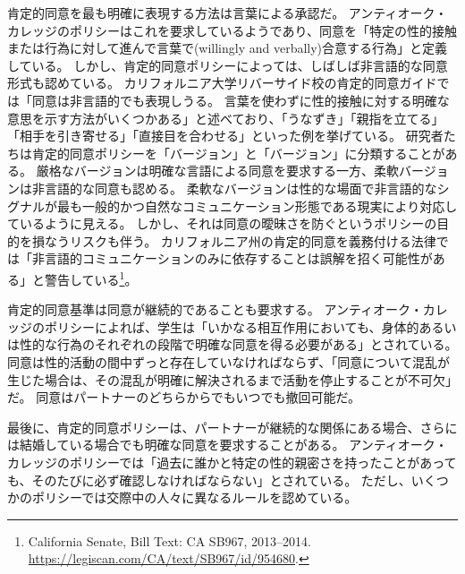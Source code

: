 \documentclass[paper=a4,book,openany]{jlreq}
\newcommand{\ig}[1]{}           %
\begin{document}
肯定的同意を最も明確に表現する方法は言葉による承認だ。
アンティオーク・カレッジのポリシーはこれを要求しているようであり、同意を「特定の性的接触または行為に対して進んで言葉で(willingly and verbally)合意する行為」と定義している\citep{college25:_sexual_offen_preven_polic}。
しかし、肯定的同意ポリシーによっては、しばしば非言語的な同意形式も認めている。
カリフォルニア大学リバーサイド校の肯定的同意ガイドでは「同意は非言語的でも表現しうる。
言葉を使わずに性的接触に対する明確な意思を示す方法がいくつかある」と述べており、「うなずき」「親指を立てる」「相手を引き寄せる」「直接目を合わせる」といった例を挙げている\citep{university25:_what_is_consen}。
研究者たちは肯定的同意ポリシーを「バージョン」と「バージョン」に分類することがある。
厳格なバージョンは明確な言語による同意を要求する一方、柔軟バージョンは非言語的な同意も認める。
柔軟なバージョンは性的な場面で非言語的なシグナルが最も一般的かつ自然なコミュニケーション形態である現実により対応しているように見える。
しかし、それは同意の曖昧さを防ぐというポリシーの目的を損なうリスクも伴う。
カリフォルニア州の肯定的同意を義務付ける法律では「非言語的コミュニケーションのみに依存することは誤解を招く可能性がある」と警告している\footnote{California Senate, Bill Text: CA SB967, 2013--2014. \url{https://legiscan.com/CA/text/SB967/id/954680}.}。

肯定的同意基準は同意が継続的であることも要求する。
アンティオーク・カレッジのポリシーによれば、学生は「いかなる相互作用においても、身体的あるいは性的な行為のそれぞれの段階で明確な同意を得る必要がある」とされている\ig{\footnote{Antioch College.}}。
同意は性的活動の間中ずっと存在していなければならず、「同意について混乱が生じた場合は、その混乱が明確に解決されるまで活動を停止することが不可欠」だ。
同意はパートナーのどちらからでもいつでも撤回可能だ\ig{\footnote{Antioch College.}}。

最後に、肯定的同意ポリシーは、パートナーが継続的な関係にある場合、さらには結婚している場合でも明確な同意を要求することがある。
アンティオーク・カレッジのポリシーでは「過去に誰かと特定の性的親密さを持ったことがあっても、そのたびに必ず確認しなければならない」とされている。
ただし、いくつかのポリシーでは交際中の人々に異なるルールを認めている。
\end{document}
